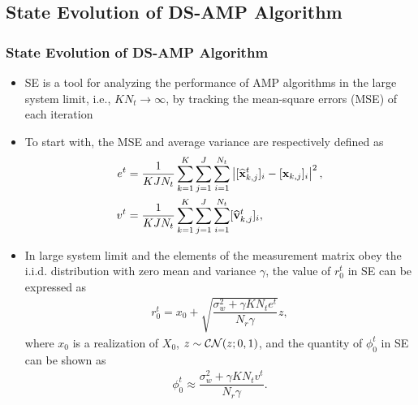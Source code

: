 \documentclass[9pt]{beamer}
\begin{document}
\subsection{State Evolution of DS-AMP Algorithm}
\begin{frame}
\frametitle{State Evolution of DS-AMP Algorithm}
\begin{itemize}
\item
SE is a tool for analyzing the performance of AMP algorithms in the large system limit, i.e., $KN_t\rightarrow \infty$, by tracking the mean-square errors (MSE) of each iteration
\item
To start with, the MSE and average variance are respectively defined as
\begin{align}
\label{eq:SEMSE} e^t&=\dfrac{1}{KJN_t}\sum\limits_{k=1}^{K}\sum\limits_{j=1}^{J}\sum\limits_{i=1}^{N_t}\left|{[\widehat{\bf x}_{k,j}^t]_i-[{\bf x}_{k,j}]_i}\right|^2,\\
\label{eq:SEVariance} v^t&=\dfrac{1}{KJN_t}\sum\limits_{k=1}^{K}\sum\limits_{j=1}^{J}\sum\limits_{i=1}^{N_t}[\widehat{\bf v}_{k,j}^t]_i,
\end{align}
\item
In large system limit and the elements of the measurement matrix obey the i.i.d. distribution with zero mean and variance $\gamma$, the value of $r_0^t$ in SE can be expressed as
\begin{equation}\label{eq:SEupdateR}
\begin{array}{l}
r_0^t=x_0+\sqrt{\dfrac{\sigma_w^2+\gamma K N_t e^t}{N_r\gamma}}z,
\end{array}
\end{equation}
where $x_0$ is a realization of $X_0$, $z\sim{\cal C}{\cal N}(z;0,1)$,
and the quantity of $\phi_0^t$ in SE can be shown as
\begin{equation}\label{eq:SEupdateSigma}
\begin{array}{l}
\phi_0^t\approx \dfrac{\sigma_w^2+\gamma KN_t v^t}{N_r\gamma}.
\end{array}
\end{equation}
\end{itemize}
\end{frame}
\end{document}
